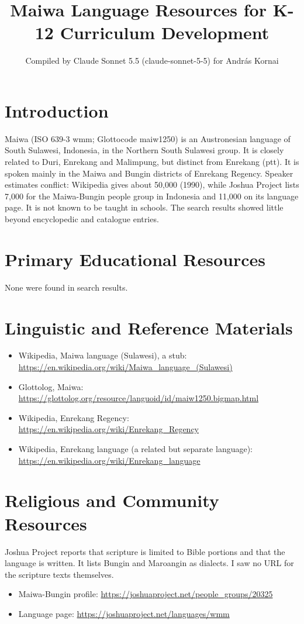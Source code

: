 \documentclass[12pt]{article}
\title{Maiwa Language Resources for K-12 Curriculum Development}
\author{Compiled by Claude Sonnet 5.5 (claude-sonnet-5-5) for Andr\'as Kornai}
\date{}
\begin{document}
\maketitle

\section{Introduction}
Maiwa (ISO 639-3 wmm; Glottocode maiw1250) is an Austronesian language of South Sulawesi, Indonesia, in the Northern South Sulawesi group. It is closely related to Duri, Enrekang and Malimpung, but distinct from Enrekang (ptt). It is spoken mainly in the Maiwa and Bungin districts of Enrekang Regency. Speaker estimates conflict: Wikipedia gives about 50,000 (1990), while Joshua Project lists 7,000 for the Maiwa-Bungin people group in Indonesia and 11,000 on its language page. It is not known to be taught in schools. The search results showed little beyond encyclopedic and catalogue entries.

\section{Primary Educational Resources}
None were found in search results.

\section{Linguistic and Reference Materials}
\begin{itemize}
\item Wikipedia, Maiwa language (Sulawesi), a stub: \url{https://en.wikipedia.org/wiki/Maiwa_language_(Sulawesi)}
\item Glottolog, Maiwa: \url{https://glottolog.org/resource/languoid/id/maiw1250.bigmap.html}
\item Wikipedia, Enrekang Regency: \url{https://en.wikipedia.org/wiki/Enrekang_Regency}
\item Wikipedia, Enrekang language (a related but separate language): \url{https://en.wikipedia.org/wiki/Enrekang_language}
\end{itemize}

\section{Religious and Community Resources}
Joshua Project reports that scripture is limited to Bible portions and that the language is written. It lists Bungin and Maroangin as dialects. I saw no URL for the scripture texts themselves.
\begin{itemize}
\item Maiwa-Bungin profile: \url{https://joshuaproject.net/people_groups/20325}
\item Language page: \url{https://joshuaproject.net/languages/wmm}
\end{itemize}
\end{document}
